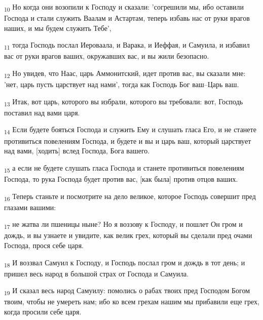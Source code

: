 \begin{tcolorbox}
\textsubscript{10} Но когда они возопили к Господу и сказали: 'согрешили мы, ибо оставили Господа и стали служить Ваалам и Астартам, теперь избавь нас от руки врагов наших, и мы будем служить Тебе',
\end{tcolorbox}
\begin{tcolorbox}
\textsubscript{11} тогда Господь послал Иероваала, и Варака, и Иеффая, и Самуила, и избавил вас от руки врагов ваших, окружавших вас, и вы жили безопасно.
\end{tcolorbox}
\begin{tcolorbox}
\textsubscript{12} Но увидев, что Наас, царь Аммонитский, идет против вас, вы сказали мне: 'нет, царь пусть царствует над нами', тогда как Господь Бог ваш--Царь ваш.
\end{tcolorbox}
\begin{tcolorbox}
\textsubscript{13} Итак, вот царь, которого вы избрали, которого вы требовали: вот, Господь поставил над вами царя.
\end{tcolorbox}
\begin{tcolorbox}
\textsubscript{14} Если будете бояться Господа и служить Ему и слушать гласа Его, и не станете противиться повелениям Господа, и будете и вы и царь ваш, который царствует над вами, [ходить] вслед Господа, Бога вашего.
\end{tcolorbox}
\begin{tcolorbox}
\textsubscript{15} а если не будете слушать гласа Господа и станете противиться повелениям Господа, то рука Господа будет против вас, [как была] против отцов ваших.
\end{tcolorbox}
\begin{tcolorbox}
\textsubscript{16} Теперь станьте и посмотрите на дело великое, которое Господь совершит пред глазами вашими:
\end{tcolorbox}
\begin{tcolorbox}
\textsubscript{17} не жатва ли пшеницы ныне? Но я воззову к Господу, и пошлет Он гром и дождь, и вы узнаете и увидите, как велик грех, который вы сделали пред очами Господа, прося себе царя.
\end{tcolorbox}
\begin{tcolorbox}
\textsubscript{18} И воззвал Самуил к Господу, и Господь послал гром и дождь в тот день; и пришел весь народ в большой страх от Господа и Самуила.
\end{tcolorbox}
\begin{tcolorbox}
\textsubscript{19} И сказал весь народ Самуилу: помолись о рабах твоих пред Господом Богом твоим, чтобы не умереть нам; ибо ко всем грехам нашим мы прибавили еще грех, когда просили себе царя.
\end{tcolorbox}
